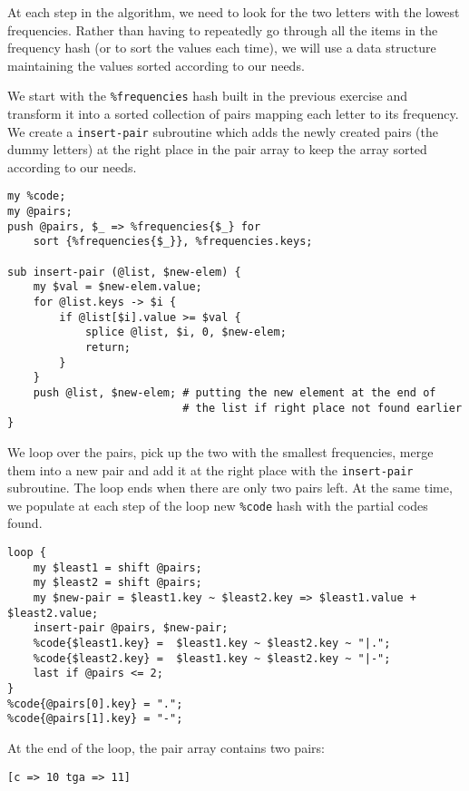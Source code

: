 At each step in the algorithm, we need to look for 
the two letters with the lowest frequencies. Rather than 
having to repeatedly go through all the items in the 
frequency hash (or to sort the values each time), we 
will use a data structure maintaining the values 
sorted according to our needs.

We start with the \verb'%frequencies' hash built in the 
previous exercise and transform it into a sorted collection 
of pairs mapping each letter to its frequency. We create 
a {\tt insert-pair} subroutine which adds the newly created 
pairs (the dummy letters) at the right place in the pair array 
to keep the array sorted according to our needs.

\begin{verbatim}
my %code;
my @pairs;
push @pairs, $_ => %frequencies{$_} for 
    sort {%frequencies{$_}}, %frequencies.keys;

sub insert-pair (@list, $new-elem) {
    my $val = $new-elem.value;
    for @list.keys -> $i {
        if @list[$i].value >= $val {
            splice @list, $i, 0, $new-elem;
            return;
        }
    }
    push @list, $new-elem; # putting the new element at the end of 
                           # the list if right place not found earlier
}
\end{verbatim}

We loop over the pairs, pick up the two with the smallest 
frequencies, merge them into a new pair and add it at the right 
place with the {\tt insert-pair} subroutine. The loop ends when 
there are only two pairs left. At the same time, we populate at 
each step of the loop new \verb'%code' hash with the partial codes 
found.

\begin{verbatim}
loop {
    my $least1 = shift @pairs;
    my $least2 = shift @pairs;
    my $new-pair = $least1.key ~ $least2.key => $least1.value + $least2.value;
    insert-pair @pairs, $new-pair;
    %code{$least1.key} =  $least1.key ~ $least2.key ~ "|.";
    %code{$least2.key} =  $least1.key ~ $least2.key ~ "|-";
    last if @pairs <= 2;
}
%code{@pairs[0].key} = ".";
%code{@pairs[1].key} = "-";
\end{verbatim}

At the end of the loop, the pair array contains two pairs:

\begin{verbatim}
[c => 10 tga => 11]
\end{verbatim}


